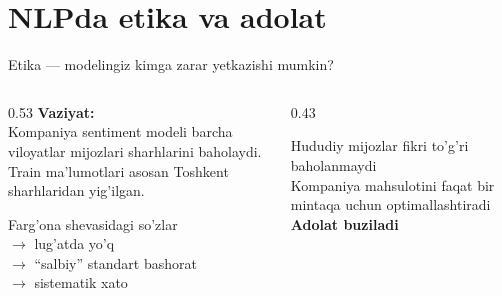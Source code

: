 \documentclass[aspectratio=169,11pt]{beamer}
\begin{document}
\section[Etika]{NLPda etika va adolat}

\begin{frame}{Etika --- modelingiz kimga zarar yetkazishi mumkin?}
  \begin{columns}[T]
    \begin{column}{0.53\textwidth}
      \small
      \textbf{Vaziyat:}\\
      Kompaniya sentiment modeli
      barcha viloyatlar mijozlari
      sharhlarini baholaydi.\\[5pt]
      Train ma'lumotlari asosan Toshkent sharhlaridan yig'ilgan.\\[4pt]
      \begin{tcolorbox}[warnbox]
        \small
        Farg'ona shevasidagi so'zlar\\
        $\to$ lug'atda yo'q\\
        $\to$ ``salbiy'' standart bashorat\\
        $\to$ sistematik xato
      \end{tcolorbox}
    \end{column}
    \begin{column}{0.43\textwidth}
      \vspace{10pt}
      \begin{tcolorbox}[defbox,title=Agar hal qilinmasa]
        \small
        Hududiy mijozlar fikri to'g'ri baholanmaydi\\[3pt]
        Kompaniya mahsulotini
        faqat bir mintaqa uchun
        optimallashtiradi\\[3pt]
        \textbf{Adolat buziladi}
      \end{tcolorbox}
    \end{column}
  \end{columns}
\end{frame}
\end{document}
